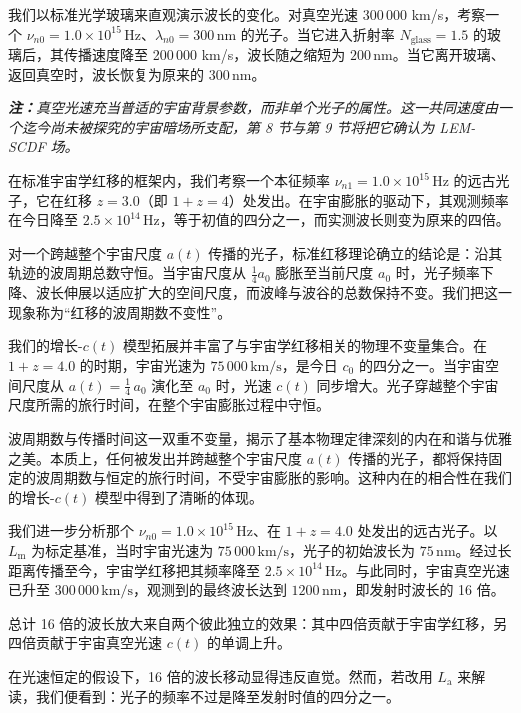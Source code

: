 \documentclass[12pt,leqno]{article}
\begin{document}
	我们以标准光学玻璃来直观演示波长的变化。对真空光速 300\,000 km/s，考察一个 $\nu_{n0}=1.0\times10^{15}\,\mathrm{Hz}$、$\lambda_{n0}=300\,\mathrm{nm}$ 的光子。当它进入折射率 $N_{\text{glass}}=1.5$ 的玻璃后，其传播速度降至 200\,000 km/s，波长随之缩短为 $200\,\mathrm{nm}$。当它离开玻璃、返回真空时，波长恢复为原来的 $300\,\mathrm{nm}$。
	
	\medskip
	\textit{\textbf{注：}真空光速充当普适的宇宙背景参数，而非单个光子的属性。这一共同速度由一个迄今尚未被探究的宇宙暗场所支配，第 8 节与第 9 节将把它确认为 LEM-SCDF 场。}
	
	\medskip
	在标准宇宙学红移的框架内，我们考察一个本征频率 $\nu_{n1}=1.0\times 10^{15}\,\mathrm{Hz}$ 的远古光子，它在红移 $z=3.0$（即 $1+z=4$）处发出。在宇宙膨胀的驱动下，其观测频率在今日降至 $2.5\times 10^{14}\,\mathrm{Hz}$，等于初值的四分之一，而实测波长则变为原来的四倍。
	
	\medskip
	对一个跨越整个宇宙尺度 $a(t)$ 传播的光子，标准红移理论确立的结论是：沿其轨迹的波周期总数守恒。当宇宙尺度从 $\frac{1}{4}a_0$ 膨胀至当前尺度 $a_0$ 时，光子频率下降、波长伸展以适应扩大的空间尺度，而波峰与波谷的总数保持不变。我们把这一现象称为“红移的波周期数不变性”。
	
	\medskip
	我们的增长-$c(t)$ 模型拓展并丰富了与宇宙学红移相关的物理不变量集合。在 $1+z=4.0$ 的时期，宇宙光速为 $75\,000\,\mathrm{km/s}$，是今日 $c_0$ 的四分之一。当宇宙空间尺度从 $a(t)=\frac{1}{4}\, a_0$ 演化至 $a_0$ 时，光速 $c(t)$ 同步增大。光子穿越整个宇宙尺度所需的旅行时间，在整个宇宙膨胀过程中守恒。
	
	\medskip
	波周期数与传播时间这一双重不变量，揭示了基本物理定律深刻的内在和谐与优雅之美。本质上，任何被发出并跨越整个宇宙尺度 $a(t)$ 传播的光子，都将保持固定的波周期数与恒定的旅行时间，不受宇宙膨胀的影响。这种内在的相合性在我们的增长-$c(t)$ 模型中得到了清晰的体现。
	
	\medskip
	我们进一步分析那个 $\nu_{n0}=1.0\times10^{15}\,\mathrm{Hz}$、在 $1+z=4.0$ 处发出的远古光子。以 $L_\mathrm{m}$ 为标定基准，当时宇宙光速为 $75\,000\,\mathrm{km/s}$，光子的初始波长为 $75\,\mathrm{nm}$。经过长距离传播至今，宇宙学红移把其频率降至 $2.5\times 10^{14}\,\mathrm{Hz}$。与此同时，宇宙真空光速已升至 $300\,000\, \mathrm{km/s}$，观测到的最终波长达到 $1200\,\mathrm{nm}$，即发射时波长的 16 倍。
	
	\medskip
	总计 16 倍的波长放大来自两个彼此独立的效果：其中四倍贡献于宇宙学红移，另四倍贡献于宇宙真空光速 $c(t)$ 的单调上升。
	
	\medskip
	在光速恒定的假设下，16 倍的波长移动显得违反直觉。然而，若改用 $L_\mathrm{a}$ 来解读，我们便看到：光子的频率不过是降至发射时值的四分之一。
	
\end{document}
